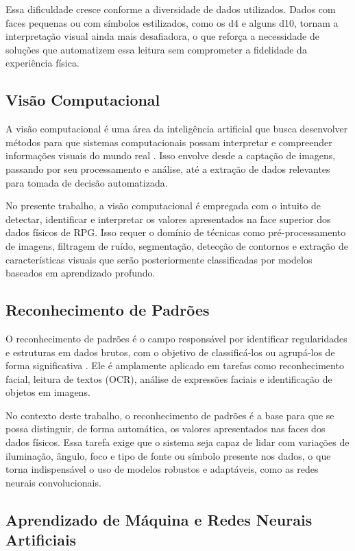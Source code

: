 Essa dificuldade cresce conforme a diversidade de dados utilizados.
Dados com faces pequenas ou com símbolos estilizados, como os d4
e alguns d10, tornam a interpretação visual ainda mais desafiadora,
o que reforça a necessidade de soluções que automatizem essa
leitura sem comprometer a fidelidade da experiência física.

\subsection{Visão Computacional}

A visão computacional é uma área da inteligência artificial que
busca desenvolver métodos para que sistemas computacionais possam
interpretar e compreender informações visuais do mundo real
\cite{szeliski2010computer}. Isso envolve desde a captação de imagens,
passando por seu processamento e análise, até a extração de dados
relevantes para tomada de decisão automatizada.

No presente trabalho, a visão computacional é empregada com o
intuito de detectar, identificar e interpretar os valores apresentados
na face superior dos dados físicos de RPG. Isso requer o domínio
de técnicas como pré-processamento de imagens, filtragem de ruído,
segmentação, detecção de contornos e extração de características
visuais que serão posteriormente classificadas por modelos baseados
em aprendizado profundo.

\subsection{Reconhecimento de Padrões}

O reconhecimento de padrões é o campo responsável por identificar
regularidades e estruturas em dados brutos, com o objetivo de
classificá-los ou agrupá-los de forma significativa
\cite{bishop2006pattern}. Ele é amplamente aplicado em tarefas como
reconhecimento facial, leitura de textos (OCR), análise de expressões
faciais e identificação de objetos em imagens.

No contexto deste trabalho, o reconhecimento de padrões é a base
para que se possa distinguir, de forma automática, os valores
apresentados nas faces dos dados físicos. Essa tarefa exige que
o sistema seja capaz de lidar com variações de iluminação, ângulo,
foco e tipo de fonte ou símbolo presente nos dados, o que torna
indispensável o uso de modelos robustos e adaptáveis, como as
redes neurais convolucionais.

\subsection{Aprendizado de Máquina e Redes Neurais Artificiais}

